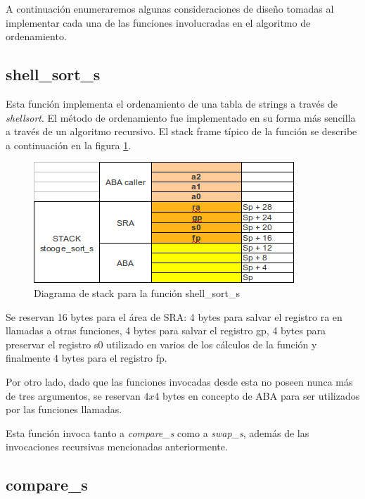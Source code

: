 \documentclass[a4paper,11pt]{article}
\begin{document}
A continuación enumeraremos algunas consideraciones de diseño tomadas al
implementar cada una de las funciones involucradas en el algoritmo de
ordenamiento.

\subsection{shell\_sort\_s}

Esta función implementa el ordenamiento de una tabla de strings a través de
\textit{shellsort}. El método de ordenamiento fue implementado en su forma más
sencilla a través de un algoritmo recursivo. El stack frame típico de la
función se describe a continuación en la figura \ref{fig:stackshell}.

\begin{figure}[h!]
  \centering
  \includegraphics[width=\textwidth]{docs/stack_stooge_sort_s.png}
  \caption{Diagrama de stack para la función shell\_sort\_s} \label{fig:stackshell}
\end{figure}

\FloatBarrier

Se reservan 16 bytes para el área de SRA: 4 bytes para salvar el registro ra en
llamadas a otras funciones, 4 bytes para salvar el registro gp, 4 bytes para
preservar el registro s0 utilizado en varios de los cálculos de la función y
finalmente 4 bytes para el registro fp.

Por otro lado, dado que las funciones invocadas desde esta no poseen nunca más
de tres argumentos, se reservan \(4 x 4\) bytes en concepto de ABA para ser
utilizados por las funciones llamadas.

Esta función invoca tanto a \textit{compare\_s} como a \textit{swap\_s}, además
de las invocaciones recursivas mencionadas anteriormente.

\subsection{compare\_s}
\end{document}
